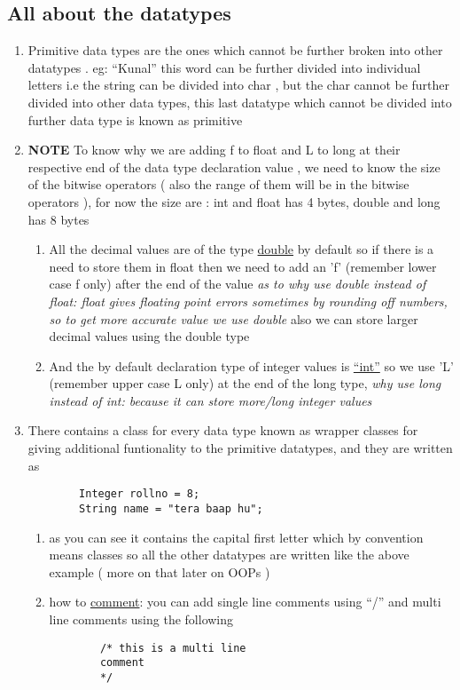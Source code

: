 \documentclass[11pt]{article}
\begin{document}
\subsection{All about the datatypes}
\label{sec:org634e419}
\begin{enumerate}
\item Primitive data types are the ones which cannot be further broken into other datatypes . eg: ``Kunal'' this word can be further divided into individual letters i.e the string can be divided into char , but the char cannot be further divided into other data types, this last datatype which cannot be divided into further data type is known as primitive
\item \textbf{NOTE} To know why we are adding f to float and L to long at their respective end of the data type declaration value , we need to know the size of the bitwise operators ( also the range of them will be in the bitwise operators ),
for now the size are : int and float has 4 bytes, double and long has 8 bytes
\begin{enumerate}
\item All the decimal values are of the type \uline{double} by default so if there is a need to store them in float then we need to add an 'f' (remember lower case f only) after the end of the value
\emph{as to why use double instead of float: float gives floating point errors sometimes by rounding off numbers, so to get more accurate value we use double}
also we can  store larger decimal values using the double type
\item And the by default declaration type of integer values is \uline{``int''} so we use 'L' (remember upper case L only) at the end of the long type,
\emph{why use long instead of int: because it can store more/long integer values}
\end{enumerate}
\item There contains a class for every data type known as wrapper classes for giving additional funtionality to the primitive datatypes, and they are written as
\begin{verbatim}
        Integer rollno = 8;
        String name = "tera baap hu";
\end{verbatim}
\begin{enumerate}
\item as you can see it contains the capital first letter which by convention means classes so all the other datatypes are written like the above example ( more on that later on OOPs )

\item how to \uline{comment}:  you can add single line comments using ``/'' and multi line comments using the following
\begin{verbatim}
        /* this is a multi line
        comment
        */
\end{verbatim}
\end{enumerate}
\end{enumerate}
\end{document}

